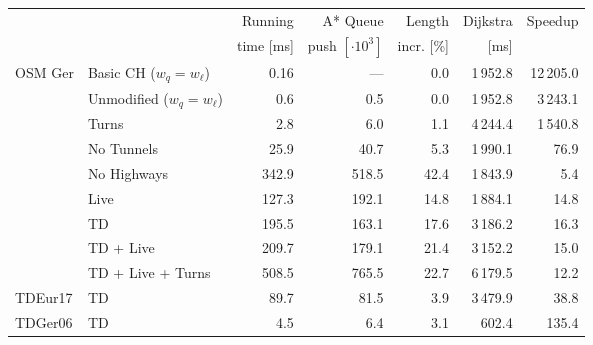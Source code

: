\begin{tabular}{llrrrrr}
\toprule
 & &   Running &               A* Queue &     Length & Dijkstra & Speedup \\ & & time [ms] & push $[\cdot 10^3]$ & incr. [\%] &     [ms] &         \\
\midrule
\multirow{9}{*}{OSM Ger} & Basic CH ($w_q=w_\ell$) &              0.16 &              --- &       0.0 &                    1\,952.8 &   12\,205.0 \\
 & Unmodified ($w_q=w_\ell$) &              0.6 &              0.5 &       0.0 &                    1\,952.8 &   3\,243.1 \\
        & Turns &              2.8 &              6.0 &       1.1 &                    4\,244.4 &   1\,540.8 \\
        & No Tunnels &             25.9 &             40.7 &       5.3 &                    1\,990.1 &     76.9 \\
        & No Highways &            342.9 &            518.5 &      42.4 &                    1\,843.9 &      5.4 \\
        & Live &            127.3 &            192.1 &      14.8 &                    1\,884.1 &     14.8 \\
        & TD &            195.5 &            163.1 &      17.6 &                    3\,186.2 &     16.3 \\
        & TD + Live &            209.7 &            179.1 &      21.4 &                    3\,152.2 &     15.0 \\
        & TD + Live + Turns &            508.5 &            765.5 &      22.7 &                    6\,179.5 &     12.2 \\
\addlinespace
TDEur17 & TD &             89.7 &             81.5 &       3.9 &                    3\,479.9 &     38.8 \\
TDGer06 & TD &              4.5 &              6.4 &       3.1 &                     602.4 &    135.4 \\
\bottomrule
\end{tabular}


